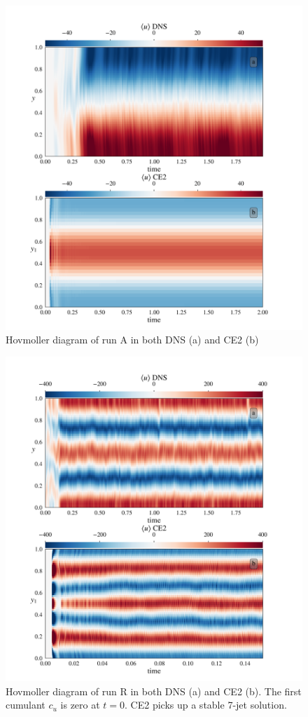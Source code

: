 \documentclass{jfm}
\begin{document}
\begin{figure}[h]
  \centering
  \includegraphics[width=\textwidth]{../../figs/hov_cu_dns_ce2_run_A.pdf}
  \caption{Hovmoller diagram of run A in both DNS (a) and CE2 (b)}
  \label{fig:hov_run_A}
\end{figure}

\begin{figure}[h]
  \centering
  \includegraphics[width=\textwidth]{../../figs/hov_cu_dns_ce2_run_R.pdf}
  \caption{Hovmoller diagram of run R in both DNS (a) and CE2 (b). The first cumulant $c_u$ is zero at $t = 0$. CE2 picks up a stable 7-jet solution.}
  \label{fig:hov_run_R}
\end{figure}
\end{document}
